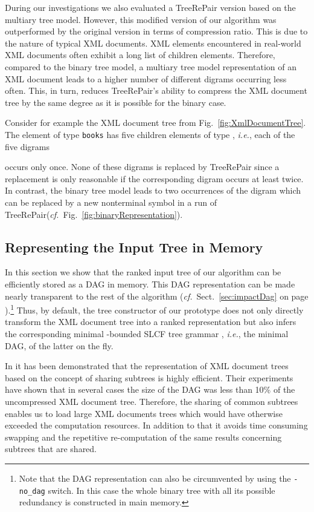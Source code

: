 \documentclass[12pt]{llncs}
\newcommand{\tp}{digram\xspace}
\newcommand{\tps}{digrams\xspace}
\newcommand{\trp}{\mbox{TreeRePair}\xspace}
\newcommand{\hairsp}{\hspace{1pt}}\newcommand{\TODO}{\textcolor{red}{\bf TODO!}\xspace}
\newcommand{\ie}{\mbox{\textit{i.\hairsp{}e.}}\xspace}
\newcommand{\cf}{\textit{cf.}~}
\begin{document}
During our investigations we also evaluated a \trp version based on the multiary tree model. However, this modified version of our algorithm was outperformed by the original version in terms of compression ratio. This is due to the nature of typical XML documents. XML elements encountered in real-world XML documents often exhibit a long list of children elements. Therefore, compared to the binary tree model, a multiary tree model representation of an XML document leads to a higher number of different \tps occurring less often. This, in turn, reduces \trp's ability to compress the XML document tree by the same degree as it is possible for the binary case.
\begin{example}
Consider for example the XML document tree from Fig.~\ref{fig:XmlDocumentTree}. The element of type \verb|books| has five children elements of type , \ie, each of the five \tps

occurs only once. None of these \tps is replaced by TreeRePair since a replacement is only reasonable if the corresponding \tp occurs at least twice. In contrast, the binary tree model  leads to two occurrences of the \tp  which can be replaced by a new nonterminal symbol in a run of \trp (\cf Fig.~\ref{fig:binaryRepresentation}).
\end{example}



\subsection{Representing the Input Tree in Memory}\label{sec:representingTreeInMemory}


In this section we show that the ranked input tree of our algorithm can be efficiently stored as a DAG in memory. This DAG representation can be made nearly transparent to the rest of the algorithm (\cf Sect.~\ref{sec:impactDag} on page \pageref{sec:impactDag}).\footnote{Note that the DAG representation can also be circumvented by using the \texttt{-no\_dag} switch. In this case the whole binary tree with all its possible redundancy is constructed in main memory.} Thus, by default, the tree constructor of our prototype does not only directly transform the XML document tree into a ranked representation but also infers the corresponding minimal -bounded SLCF tree grammar , \ie, the minimal DAG, of the latter on the fly.

In \cite{Buneman03path} it has been demonstrated that the representation of XML document trees based on the concept of sharing subtrees is highly efficient. Their experiments have shown that in several cases the size of the DAG was less than 10\% of the uncompressed XML document tree. Therefore, the sharing of common subtrees enables us to load large XML documents trees which would have otherwise exceeded the computation resources. In addition to that it avoids time consuming swapping and the repetitive re-computation of the same results concerning subtrees that are shared.
\end{document}
